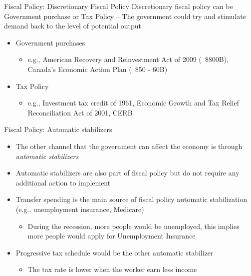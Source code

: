 \documentclass[aspectratio=1610]{beamer}
\begin{document}
\begin{frame}[wide]{Fiscal Policy: Discretionary Fiscal Policy }
	Discretionary fiscal policy can be Government purchase or Tax Policy -- The government could try and stimulate demand back to the level of potential output
	\vspace{2mm}
	\begin{itemize}
		\item Government purchases
		\vspace{1mm}
		\begin{itemize}
			\item e.g., American Recovery and Reinvestment Act of 2009 (~\$800B), Canada's Economic Action Plan (~\$50 - 60B)
		\end{itemize}
		\item Tax Policy
		\vspace{1mm}
		\begin{itemize}
			\item e.g., Investment tax credit of 1961, Economic Growth and Tax Relief Reconciliation Act of 2001, CERB
		\end{itemize}
		
	\end{itemize}
\end{frame}

\begin{frame}[wide]{Fiscal Policy: Automatic stabilizers}
	\begin{itemize}
		\item The other channel that the government can affect the economy is through \textit{automatic stabilizers}
		\vspace{2mm}
		\item Automatic stabilizers are also part of fiscal policy but do not require any additional action to implement
		\vspace{2mm}
		\item Transfer spending is the main source of fiscal policy automatic stabilization (e.g., unemployment insurance, Medicare)
		\vspace{2mm}
		\begin{itemize}
			\item During the recession, more people would be unemployed, this implies more people would apply for Unemployment Insurance
		\end{itemize}
		\vspace{2mm}
		\item Progressive tax schedule would be the other automatic stabilizer
		\begin{itemize}
			\item The tax rate is lower when the worker earn less income 
		\end{itemize}
	\end{itemize}
\end{frame}
\end{document}
